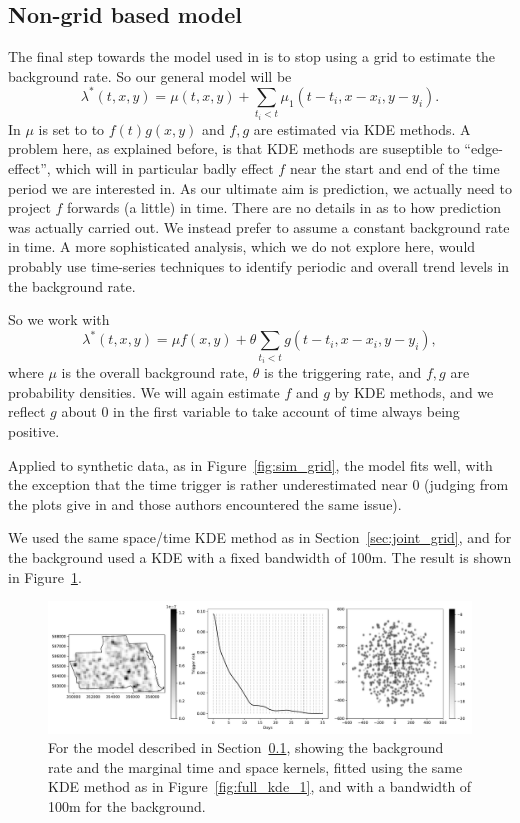 \documentclass[twoside,a4paper]{article}
\theoremstyle{plain}
\theoremstyle{definition}
\begin{document}
\subsection{Non-grid based model}\label{sec:no_grid_kde}

The final step towards the model used in \cite{sepp2} is to stop using a grid to estimate
the background rate.  So our general model will be
\[ \lambda^*(t,x,y) = \mu(t,x,y) + \sum_{t_i < t} \mu_1(t-t_i, x-x_i, y-y_i). \]
In \cite{sepp2} $\mu$ is set to to $f(t)g(x,y)$ and $f,g$ are estimated via KDE methods.
A problem here, as explained before, is that KDE methods are suseptible to ``edge-effect'',
which will in particular badly effect $f$ near the start and end of the time period we are
interested in.  As our ultimate aim is prediction, we actually need to project $f$ forwards
(a little) in time.  There are no details in \cite{sepp2} as to how prediction was actually
carried out.  We instead prefer to assume a constant background rate in time.
A more sophisticated analysis, which we do not explore here, would probably use time-series
techniques to identify periodic and overall trend levels in the background rate.

So we work with
\[ \lambda^*(t,x,y) = \mu f(x,y) + \theta \sum_{t_i < t} g(t-t_i, x-x_i, y-y_i), \]
where $\mu$ is the overall background rate, $\theta$ is the triggering rate, and $f,g$
are probability densities.  We will again estimate $f$ and $g$ by KDE methods, and we
reflect $g$ about $0$ in the first variable to take account of time always being positive.

Applied to synthetic data, as in Figure~\ref{fig:sim_grid}, the model fits well, with the
exception that the time trigger is rather underestimated near $0$ (judging from the plots give in
\cite{sepp} and \cite{rc} those authors encountered the same issue).  

We used the same space/time KDE method as in Section~\ref{sec:joint_grid}, and for the background
used a KDE with a fixed bandwidth of 100m.  The result is shown in Figure~\ref{fig:no_grid_kde_1}.

\begin{figure}
  \includegraphics[width=\textwidth]{../notebooks/no_grid_kde_1.pdf}
  \caption{For the model described in Section~\ref{sec:no_grid_kde}, showing the background
rate and the marginal time and space kernels, fitted using the same KDE method as in
Figure~\ref{fig:full_kde_1}, and with a bandwidth of 100m for the background.}
  \label{fig:no_grid_kde_1}
\end{figure}
\end{document}
